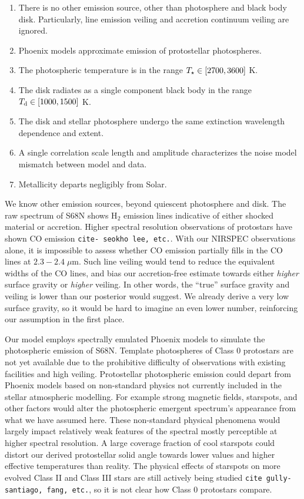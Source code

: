 \documentclass[twocolumn]{emulateapj}%
\begin{document}
\begin{enumerate}
\item There is no other emission source, other than photosphere and black body disk.  Particularly, line emission veiling and accretion continuum veiling are ignored.
\item Phoenix models approximate emission of protostellar photospheres.
\item The photospheric temperature is in the range $T_\star \in [2700,3600]$ K.
\item The disk radiates as a single component black body in the range $T_\textrm{d} \in [1000,1500]$ K.
\item The disk and stellar photosphere undergo the same extinction wavelength dependence and extent.
\item A single correlation scale length and amplitude characterizes the noise model mismatch between model and data.
\item Metallicity departs negligibly from Solar.
\end{enumerate}

We know other emission sources, beyond quiescent photosphere and disk.  The raw spectrum of S68N shows H$_2$ emission lines indicative of either shocked material or accretion.  Higher spectral resolution observations of protostars have shown CO emission \texttt{cite- seokho lee, etc.}.  With our NIRSPEC observations alone, it is impossible to assess whether CO emission partially fills in the CO lines at $2.3-2.4 \;\mu$m.  Such line veiling would tend to reduce the equivalent widths of the CO lines, and bias our accretion-free estimate towards either \emph{higher} surface gravity or \emph{higher} veiling.  In other words, the ``true'' surface gravity and veiling is lower than our posterior would suggest.  We already derive a very low surface gravity, so it would be hard to imagine an even lower number, reinforcing our assumption in the first place.

Our model employs spectrally emulated Phoenix models to simulate the photospheric emission of S68N.  Template photospheres of Class 0 protostars are not yet available due to the prohibitive difficulty of observations with existing facilities and high veiling.  Protostellar photospheric emission could depart from Phoenix models based on non-standard physics not currently included in the stellar atmospheric modelling.  For example strong magnetic fields, starspots, and other factors would alter the photospheric emergent spectrum's appearance from what we have assumed here.  These non-standard physical phenomena would largely impact relatively weak features of the spectral mostly perceptible at higher spectral resolution.  A large coverage fraction of cool starspots could distort our derived protostellar solid angle towards lower values and higher effective temperatures than reality.  The physical effects of starspots on more evolved Class II and Class III stars are still actively being studied \texttt{cite gully-santiago, fang, etc.}, so it is not clear how Class 0 protostars compare.  
\end{document}
